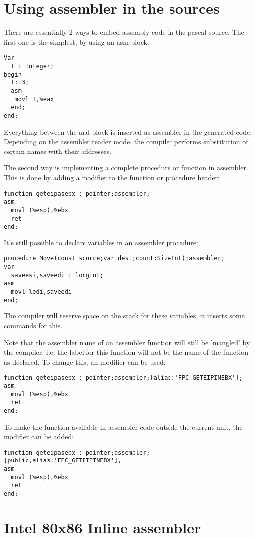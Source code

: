 \section{Using assembler in the sources}

There are essentially 2 ways to embed assembly code in the pascal source.
The first one is the simplest, by using an asm block:
\begin{verbatim}
Var
  I : Integer;
begin
  I:=3;
  asm
   movl I,%eax
  end;
end;    
\end{verbatim}
Everything between the  and  block is inserted as
assembler in the generated code. Depending on the assembler reader mode, the
compiler performs substitution of certain names with their addresses.

The second way is implementing a complete procedure or function in
assembler. This is done by adding a  modifier to the 
function or procedure header:
\begin{verbatim}
function geteipasebx : pointer;assembler;
asm
  movl (%esp),%ebx
  ret
end;
\end{verbatim}
It's still possible to declare variables in an assembler procedure:
\begin{verbatim}
procedure Move(const source;var dest;count:SizeInt);assembler;
var
  saveesi,saveedi : longint;
asm
  movl %edi,saveedi
end;
\end{verbatim}
The compiler will reserve space on the stack for these variables,
it inserts some commands for this.

Note that the assembler name of an assembler function will still be 'mangled' 
by the compiler, i.e. the label for this function will not be the name of
the function as declared. To change this, an  modifier can be
used:
\begin{verbatim}
function geteipasebx : pointer;assembler;[alias:'FPC_GETEIPINEBX'];
asm
  movl (%esp),%ebx
  ret
end;
\end{verbatim}
To make the function available in assembler code outside the current unit, 
the  modifier can be added:
\begin{verbatim}
function geteipasebx : pointer;assembler;[public,alias:'FPC_GETEIPINEBX'];
asm
  movl (%esp),%ebx
  ret
end;
\end{verbatim}

\section{Intel 80x86 Inline assembler}

